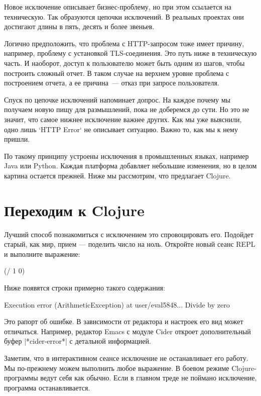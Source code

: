 Новое исключение описывает бизнес-проблему, но при этом ссылается на
техническую. Так образуются цепочки исключений. В реальных проектах они
достигают длины в пять, десять и более звеньев.

Логично предположить, что проблема с HTTP-запросом тоже имеет причину, например,
проблему с установкой TLS-соединения. Это путь ниже в техническую часть. И
наоборот, доступ к пользователю может быть одним из шагов, чтобы построить
сложный отчет. В таком случае на верхнем уровне проблема с построением отчета, а
ее причина~--- отказ при запросе пользователя.

Спуск по цепочке исключений напоминает допрос. На каждое почему мы получаем
новую пищу для размышлений, пока не доберемся до сути. Но это не значит, что
самое нижнее исключение важнее других. Как мы уже выяснили, одно лишь `HTTP
Error` не описывает ситуацию. Важно то, как мы к нему пришли.

По такому принципу устроены исключения в промышленных языках, например Java или
Python. Каждая платформа добавляет небольшие изменения, но в целом картина
остается прежней. Ниже мы рассмотрим, что предлагает Clojure.

\section{Переходим к Clojure}

Лучший способ познакомиться с исключением это спровоцировать его. Подойдет
старый, как мир, прием — поделить число на ноль. Откройте новый сеанс REPL и
выполните выражение:

\begin{code}
(/ 1 0)
\end{code}

Ниже появятся строки примерно такого содержания:

\begin{code}
Execution error (ArithmeticException) at user/eval5848...
Divide by zero
\end{code}

Это рапорт об ошибке. В зависимости от редактора и настроек его вид может
отличаться. Например, редактор Emacs с модуле Cider откроет дополнительный буфер
\spverb|*cider-error*| с детальной информацией.

Заметим, что в интерактивном сеансе исключение не останавливает его работу. Мы
по-прежнему можем выполнить любое выражение. В боевом режиме Clojure-программы
ведут себя как обычно. Если в главном треде не поймано исключение, программа
останавливается.

